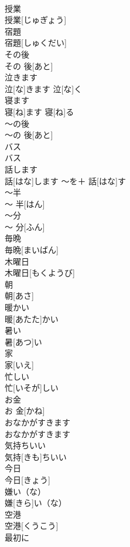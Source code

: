 \documentclass[8pt]{extreport}
\begin{document}
\begin{CJK}{UTF8}{min}
\\	授業	
\\	授業[じゅぎょう]		
\\	宿題	
\\	宿題[しゅくだい]		
\\	その後	
\\	その 後[あと]		
\\	泣きます	
\\	泣[な]きます	泣[な]く	
\\	寝ます	
\\	寝[ね]ます	寝[ね]る	
\\	〜の後	
\\	〜の 後[あと]		
\\	バス	
\\	バス		
\\	話します	
\\	話[はな]します	〜を＋ 話[はな]す	
\\	〜半	
\\	〜 半[はん]		
\\	〜分	
\\	〜 分[ふん]		
\\	毎晩	
\\	毎晩[まいばん]		
\\	木曜日	
\\	木曜日[もくようび]		
\\	朝	
\\	朝[あさ]		
\\	暖かい	
\\	暖[あたた]かい		
\\	暑い	
\\	暑[あつ]い		
\\	家	
\\	家[いえ]		
\\	忙しい	
\\	忙[いそが]しい		
\\	お金	
\\	お 金[かね]		
\\	おなかがすきます	
\\	おなかがすきます		
\\	気持ちいい	
\\	気持[きも]ちいい		
\\	今日	
\\	今日[きょう]		
\\	嫌い（な）	
\\	嫌[きら]い（な）		
\\	空港	
\\	空港[くうこう]		
\\	最初に	

\end{CJK}
\end{document}
